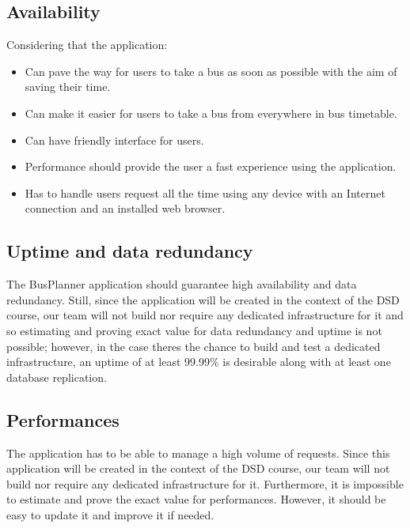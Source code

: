 \subsection{Availability}
Considering that the application:
\begin{itemize}
	\item Can pave the way for users to take a bus as soon as possible with the aim of saving their time.
	\item Can make it easier for users to take a bus from everywhere in bus timetable.
	\item Can have friendly interface for users.
	\item Performance should provide the user a fast experience using the application.
	\item Has to handle user\textquotesingle s request all the time using any device with an Internet connection and an installed web browser.
\end{itemize}
\subsection{Uptime and data redundancy}
The BusPlanner application should guarantee high availability and data redundancy. Still, since the application will be created in the context of the DSD course, our team will not build nor require any dedicated infrastructure for it and so estimating and proving exact value for data redundancy and uptime is not possible; however, in the case there\textquotesingle s the chance to build and test a dedicated infrastructure, an uptime of at least 99.99\% is desirable along with at least one database replication.
\subsection{Performances}
The application has to be able to manage a high volume of requests. Since this application will be created in the context of the DSD course, our team will not build nor require any dedicated infrastructure for it. Furthermore, it is impossible to estimate and prove the exact value for performances. However, it should be easy to update it and improve it if needed. 